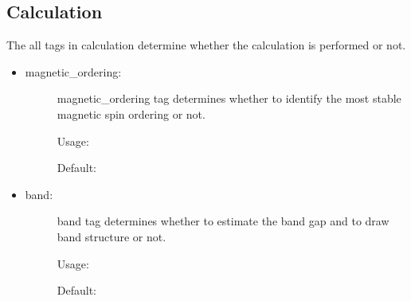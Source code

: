 \documentclass[letterpaper,10pt,english]{sphinxmanual}
\begin{document}
\subsection{Calculation}
\label{\detokenize{Input/Configuration:calculation}}
The all tags in calculation determine whether the calculation is performed or not.
\begin{itemize}
\item {} \begin{description}
\item[{magnetic\_ordering:}] \leavevmode
magnetic\_ordering tag determines whether to identify the most stable magnetic spin ordering or not.

Usage:

\begin{sphinxVerbatim}[commandchars=\\\{\}]
     
\end{sphinxVerbatim}

Default:

\begin{sphinxVerbatim}[commandchars=\\\{\}]
   
\end{sphinxVerbatim}

\end{description}

\item {} \begin{description}
\item[{band:}] \leavevmode
band tag determines whether to estimate the band gap and to draw band structure or not.

Usage:

\begin{sphinxVerbatim}[commandchars=\\\{\}]
     
\end{sphinxVerbatim}

Default:

\begin{sphinxVerbatim}[commandchars=\\\{\}]
   
\end{sphinxVerbatim}


\end{description}
\end{itemize}
\end{document}
